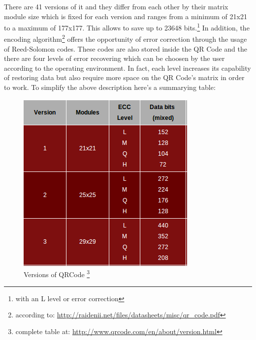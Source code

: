 There are 41 versions of it and they differ from each other by their matrix 
module size which is fixed for each version and ranges from a minimum of 21x21 
to a maximum of 177x177. This allows to save up to 23648 bits.\footnote{with an L level or error correction} 
\newline 
In addition, the encoding algorithm\footnote{ according to: \url{http://raidenii.net/files/datasheets/misc/qr_code.pdf}} offers the opportunity of error correction through the usage of Reed-Solomon codes.
These codes are also stored inside the QR Code and the there are four levels of error recovering which can be choosen by the user according to the operating environment.
In fact, each level increases its capability of restoring data but also require more space on the QR Code's matrix in order to work. 
\newpage
To simplify the above description here's a summarying table:
\begin{figure}[hbt]
    \centering
    \caption{Versions of QRCode \protect \footnote{complete table at: \protect \url{http://www.qrcode.com/en/about/version.html}}}
    \includegraphics[scale=0.9]{img/qrversion.png}
\end{figure}


   













  
